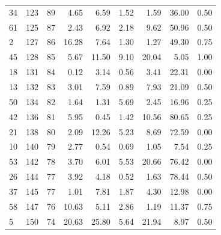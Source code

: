\begin{tabular}{@{}l r r r r r r r l@{}}
34 & 123 & 89 & 4.65 & 6.59 & 1.52 & 1.59 & 36.00 & 0.50 \\
61 & 125 & 87 & 2.43 & 6.92 & 2.18 & 9.62 & 50.96 & 0.50 \\
2 & 127 & 86 & 16.28 & 7.64 & 1.30 & 1.27 & 49.30 & 0.75 \\
45 & 128 & 85 & 5.67 & 11.50 & 9.10 & 20.04 & 5.05 & 1.00 \\
18 & 131 & 84 & 0.12 & 3.14 & 0.56 & 3.41 & 22.31 & 0.00 \\
13 & 132 & 83 & 3.01 & 7.59 & 0.89 & 7.93 & 21.09 & 0.50 \\
50 & 134 & 82 & 1.64 & 1.31 & 5.69 & 2.45 & 16.96 & 0.25 \\
42 & 136 & 81 & 5.95 & 0.45 & 1.42 & 10.56 & 80.65 & 0.25 \\
21 & 138 & 80 & 2.09 & 12.26 & 5.23 & 8.69 & 72.59 & 0.00 \\
10 & 140 & 79 & 2.77 & 0.54 & 0.69 & 1.05 & 7.54 & 0.25 \\
53 & 142 & 78 & 3.70 & 6.01 & 5.53 & 20.66 & 76.42 & 0.00 \\
26 & 144 & 77 & 3.92 & 4.18 & 0.52 & 1.63 & 78.44 & 0.50 \\
37 & 145 & 77 & 1.01 & 7.81 & 1.87 & 4.30 & 12.98 & 0.00 \\
58 & 147 & 76 & 10.63 & 5.11 & 2.86 & 1.19 & 11.37 & 0.75 \\
5 & 150 & 74 & 20.63 & 25.80 & 5.64 & 21.94 & 8.97 & 0.50 \\
\bottomrule
\end{tabular}
